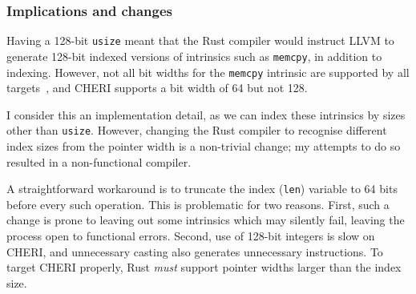 \documentclass[dissertation.tex]{subfiles}
\begin{document}
\subsubsection{Implications and changes}
Having a 128-bit \texttt{usize} meant that the Rust compiler would
instruct LLVM to generate 128-bit indexed versions of intrinsics such as
\texttt{memcpy}, in addition to indexing.
However, not all bit widths for the \texttt{memcpy} intrinsic are
supported by all targets~\cite{llvm-langref}, and CHERI supports a bit
width of 64 but not 128.

I consider this an implementation detail, as we can index these
intrinsics by sizes other than \texttt{usize}.
However, changing the Rust compiler to recognise different index sizes
from the pointer width is a non-trivial change; my attempts to do so
resulted in a non-functional compiler.

A straightforward workaround is to truncate the index (\texttt{len})
variable to 64 bits before every such operation.
This is problematic for two reasons.
First, such a change is prone to leaving out some intrinsics which may
silently fail, leaving the process open to functional errors.
Second, use of 128-bit integers is slow on CHERI, and unnecessary
casting also generates unnecessary instructions.
To target CHERI properly, Rust \emph{must} support pointer widths larger
than the index size.
\end{document}
